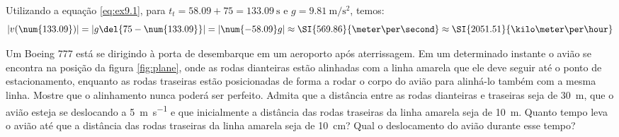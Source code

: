 \documentclass[]{IMTexam}
\begin{document}
\begin{questions}
\begin{parts}
\begin{solution}
			Utilizando a equação \ref{eq:ex9.1}, para $ t_t=\num{58.09}+75=\SI{133.09}{\second} $ e $ g=\SI{9.81}{\meter\per\second\squared} $, temos:
			\[ |v(\num{133.09})|=|g\del{75-\num{133.09}}|=|\num{-58.09}g|\approx\SI{569.86}{\meter\per\second}\approx\SI{2051.51}{\kilo\meter\per\hour} \]

		\end{solution}
	\end{parts}

	\clearpage

	\question
	Um Boeing 777 está se dirigindo à porta de desembarque em um aeroporto após aterrissagem. Em um determinado instante o avião se encontra na posição da figura \ref{fig:plane}, onde as rodas dianteiras estão alinhadas com a linha amarela que ele deve seguir até o ponto de estacionamento, enquanto as rodas traseiras estão posicionadas de forma a rodar o corpo do avião para alinhá-lo também com a mesma linha. Mostre que o alinhamento nunca poderá ser perfeito. Admita que a distância entre as rodas dianteiras e traseiras seja de \SI{30}{\meter}, que o avião esteja se deslocando a \SI{5}{\meter\per\second} e que inicialmente a distância das rodas traseiras da linha amarela seja de \SI{10}{\meter}. Quanto tempo leva o avião até que a distância das rodas traseiras da linha amarela seja de \SI{10}{\centi\meter}? Qual o deslocamento do avião durante esse tempo?


\end{questions}
\end{document}
